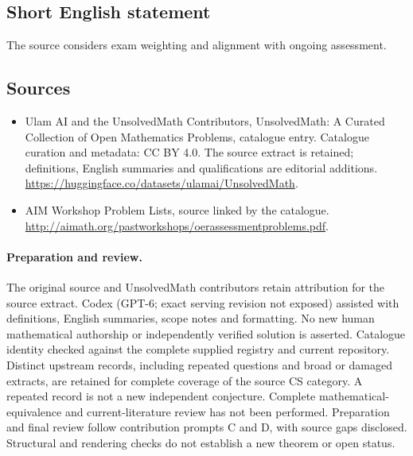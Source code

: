 \documentclass[11pt]{article}
\begin{document}
\subsection{Short English statement}
The source considers exam weighting and alignment with ongoing assessment.
\subsection{Sources}
\begin{itemize}
\item[\hypertarget{source:statement:1}{S1}] Ulam AI and the UnsolvedMath Contributors, UnsolvedMath: A Curated Collection of Open Mathematics Problems, catalogue entry. Catalogue curation and metadata: CC BY 4.0. The source extract is retained; definitions, English summaries and qualifications are editorial additions.
\url{https://huggingface.co/datasets/ulamai/UnsolvedMath}.
\item[\hypertarget{source:statement:2}{S2}] AIM Workshop Problem Lists, source linked by the catalogue.
\url{http://aimath.org/pastworkshops/oerassessmentproblems.pdf}.
\end{itemize}
\paragraph{Preparation and review.}
The original source and UnsolvedMath contributors retain attribution for the source extract. Codex (GPT-6; exact serving revision not exposed) assisted with definitions, English summaries, scope notes and formatting. No new human mathematical authorship or independently verified solution is asserted. Catalogue identity checked against the complete supplied registry and current repository. Distinct upstream records, including repeated questions and broad or damaged extracts, are retained for complete coverage of the source CS category. A repeated record is not a new independent conjecture. Complete mathematical-equivalence and current-literature review has not been performed. Preparation and final review follow contribution prompts C and D, with source gaps disclosed. Structural and rendering checks do not establish a new theorem or open status.
\label{end:statement}
\end{document}
